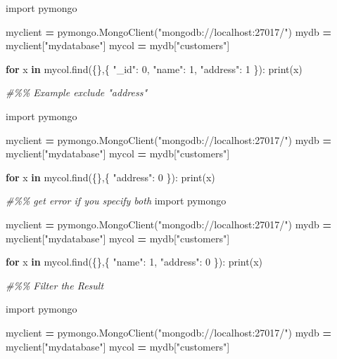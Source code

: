 \documentclass[
]{book}
\newenvironment{Shaded}{\begin{snugshade}}{\end{snugshade}}
\newcommand{\BuiltInTok}[1]{#1}
\newcommand{\CommentTok}[1]{\textcolor[rgb]{0.56,0.35,0.01}{\textit{#1}}}
\newcommand{\ControlFlowTok}[1]{\textcolor[rgb]{0.13,0.29,0.53}{\textbf{#1}}}
\newcommand{\DecValTok}[1]{\textcolor[rgb]{0.00,0.00,0.81}{#1}}
\newcommand{\ImportTok}[1]{#1}
\newcommand{\KeywordTok}[1]{\textcolor[rgb]{0.13,0.29,0.53}{\textbf{#1}}}
\newcommand{\NormalTok}[1]{#1}
\newcommand{\OperatorTok}[1]{\textcolor[rgb]{0.81,0.36,0.00}{\textbf{#1}}}
\newcommand{\StringTok}[1]{\textcolor[rgb]{0.31,0.60,0.02}{#1}}
\begin{document}
\begin{Shaded}
\begin{Highlighting}[]
\ImportTok{import}\NormalTok{ pymongo}

\NormalTok{myclient }\OperatorTok{=}\NormalTok{ pymongo.MongoClient(}\StringTok{"mongodb://localhost:27017/"}\NormalTok{)}
\NormalTok{mydb }\OperatorTok{=}\NormalTok{ myclient[}\StringTok{"mydatabase"}\NormalTok{]}
\NormalTok{mycol }\OperatorTok{=}\NormalTok{ mydb[}\StringTok{"customers"}\NormalTok{]}

\ControlFlowTok{for}\NormalTok{ x }\KeywordTok{in}\NormalTok{ mycol.find(\{\},\{ }\StringTok{"\_id"}\NormalTok{: }\DecValTok{0}\NormalTok{, }\StringTok{"name"}\NormalTok{: }\DecValTok{1}\NormalTok{, }\StringTok{"address"}\NormalTok{: }\DecValTok{1}\NormalTok{ \}):}
  \BuiltInTok{print}\NormalTok{(x)}

\CommentTok{\#\%\% Example exclude "address" }
  
\ImportTok{import}\NormalTok{ pymongo}

\NormalTok{myclient }\OperatorTok{=}\NormalTok{ pymongo.MongoClient(}\StringTok{"mongodb://localhost:27017/"}\NormalTok{)}
\NormalTok{mydb }\OperatorTok{=}\NormalTok{ myclient[}\StringTok{"mydatabase"}\NormalTok{]}
\NormalTok{mycol }\OperatorTok{=}\NormalTok{ mydb[}\StringTok{"customers"}\NormalTok{]}

\ControlFlowTok{for}\NormalTok{ x }\KeywordTok{in}\NormalTok{ mycol.find(\{\},\{ }\StringTok{"address"}\NormalTok{: }\DecValTok{0}\NormalTok{ \}):}
  \BuiltInTok{print}\NormalTok{(x)}


\CommentTok{\#\%\% get error if you specify both}
\ImportTok{import}\NormalTok{ pymongo}

\NormalTok{myclient }\OperatorTok{=}\NormalTok{ pymongo.MongoClient(}\StringTok{"mongodb://localhost:27017/"}\NormalTok{)}
\NormalTok{mydb }\OperatorTok{=}\NormalTok{ myclient[}\StringTok{"mydatabase"}\NormalTok{]}
\NormalTok{mycol }\OperatorTok{=}\NormalTok{ mydb[}\StringTok{"customers"}\NormalTok{]}

\ControlFlowTok{for}\NormalTok{ x }\KeywordTok{in}\NormalTok{ mycol.find(\{\},\{ }\StringTok{"name"}\NormalTok{: }\DecValTok{1}\NormalTok{, }\StringTok{"address"}\NormalTok{: }\DecValTok{0}\NormalTok{ \}):}
  \BuiltInTok{print}\NormalTok{(x)}


\CommentTok{\#\%\%  Filter the Result}
  
\ImportTok{import}\NormalTok{ pymongo}

\NormalTok{myclient }\OperatorTok{=}\NormalTok{ pymongo.MongoClient(}\StringTok{"mongodb://localhost:27017/"}\NormalTok{)}
\NormalTok{mydb }\OperatorTok{=}\NormalTok{ myclient[}\StringTok{"mydatabase"}\NormalTok{]}
\NormalTok{mycol }\OperatorTok{=}\NormalTok{ mydb[}\StringTok{"customers"}\NormalTok{]}


\end{Highlighting}
\end{Shaded}
\end{document}
